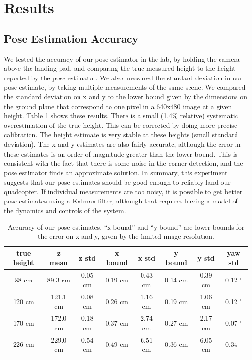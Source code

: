 \documentclass[10pt]{scrartcl} %
\begin{document}

\section{Results}

\subsection{Pose Estimation Accuracy}

We tested the accuracy of our pose estimator in the lab, by holding the camera
above the landing pad, and comparing the true measured height to the height
reported by the pose estimator. We also measured the standard deviation in our
pose estimate, by taking multiple measurements of the same scene. We compared
the standard deviation on x and y to the lower bound given by the dimensions on
the ground plane that correspond to one pixel in a 640x480 image at a given
height. Table \ref{tab:pose-accu} shows these results. There is a small (1.4\%
relative) systematic overestimation of the true height. This can be corrected
by doing more precise calibration. The height estimate is very stable at these
heights (small standard deviation). The x and y estimates are also fairly
accurate, although the error in these estimates is an order of magnitude
greater than the lower bound. This is consistent with the fact that there is
some noise in the corner detection, and the pose estimator finds an approximate
solution. In summary, this experiment suggests that our pose estimates should
be good enough to reliably land our quadcopter. If individual measurements are
too noisy, it is possible to get better pose estimates using a Kalman filter,
although that requires having a model of the dynamics and controls of the
system.

\begin{table}[h!]
    \centering
    \begin{tabular}{c|cc|cc|cc|c}
        true height & z mean    & z std     & x bound   & x std     & y bound   & y std     & yaw std \\
        \hline
         88 cm      & 89.3 cm   & 0.05 cm   & 0.19 cm   & 0.43 cm   & 0.14 cm   & 0.39 cm   & 0.12 $^{\circ}$ \\
        120 cm      & 121.1 cm  & 0.08 cm   & 0.26 cm   & 1.16 cm   & 0.19 cm   & 1.06 cm   & 0.12 $^{\circ}$ \\
        170 cm      & 172.0 cm  & 0.18 cm   & 0.37 cm   & 2.74 cm   & 0.27 cm   & 2.17 cm   & 0.07 $^{\circ}$ \\
        226 cm      & 229.0 cm  & 0.54 cm   & 0.49 cm   & 6.51 cm   & 0.36 cm   & 6.05 cm   & 0.34 $^{\circ}$ \\
    \end{tabular}
    \caption{
        Accuracy of our pose estimates. ``x bound'' and ``y bound'' are lower
        bounds for the error on x and y, given by the limited image resolution.
    }
    \label{tab:pose-accu}
\end{table}
\end{document}
